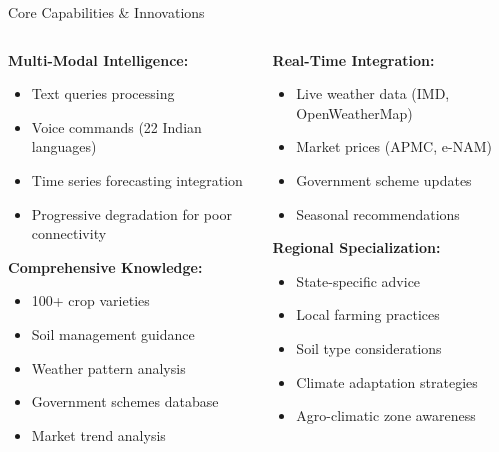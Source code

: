 \documentclass[aspectratio=169]{beamer}
\begin{document}
\begin{frame}{Core Capabilities \& Innovations}
\begin{columns}
\begin{column}{0.5\textwidth}
\textbf{Multi-Modal Intelligence:}
\begin{itemize}
\item Text queries processing
\item Voice commands (22 Indian languages)
\item Time series forecasting integration
\item Progressive degradation for poor connectivity
\end{itemize}

\textbf{Comprehensive Knowledge:}
\begin{itemize}
\item 100+ crop varieties
\item Soil management guidance
\item Weather pattern analysis
\item Government schemes database
\item Market trend analysis
\end{itemize}
\end{column}
\begin{column}{0.5\textwidth}
\textbf{Real-Time Integration:}
\begin{itemize}
\item Live weather data (IMD, OpenWeatherMap)
\item Market prices (APMC, e-NAM)
\item Government scheme updates
\item Seasonal recommendations
\end{itemize}

\textbf{Regional Specialization:}
\begin{itemize}
\item State-specific advice
\item Local farming practices
\item Soil type considerations
\item Climate adaptation strategies
\item Agro-climatic zone awareness
\end{itemize}
\end{column}
\end{columns}
\end{frame}
\end{document}
